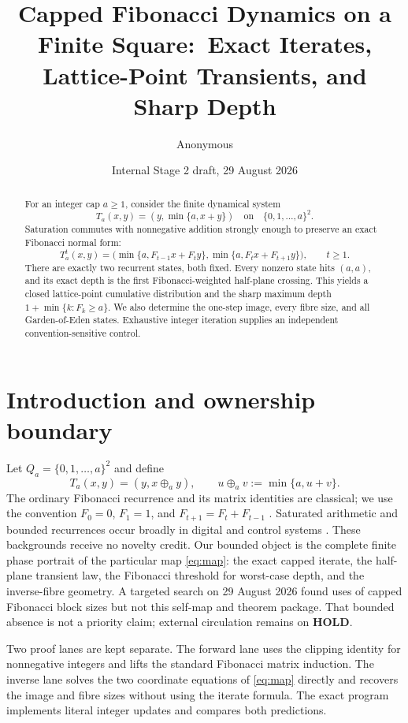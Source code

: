 \documentclass[11pt,a4paper]{amsart}
\title[Capped Fibonacci dynamics]{Capped Fibonacci Dynamics on a Finite Square:\ Exact Iterates, Lattice-Point Transients, and Sharp Depth}
\author{Anonymous}
\date{Internal Stage 2 draft, 29 August 2026}
\begin{document}
\begin{abstract}
For an integer cap $a\geq1$, consider the finite dynamical system
\[
 T_a(x,y)=(y,\min\{a,x+y\})
 \quad\text{on}\quad\{0,1,\ldots,a\}^2.
\]
Saturation commutes with nonnegative addition strongly enough to preserve an
exact Fibonacci normal form:
\[
 T_a^t(x,y)=
 \bigl(\min\{a,F_{t-1}x+F_ty\},
       \min\{a,F_tx+F_{t+1}y\}\bigr),\qquad t\geq1.
\]
There are exactly two recurrent states, both fixed.  Every nonzero state
hits $(a,a)$, and its exact depth is the first Fibonacci-weighted half-plane
crossing.  This yields a closed lattice-point cumulative distribution and
the sharp maximum depth $1+\min\{k:F_k\geq a\}$.  We also determine the
one-step image, every fibre size, and all Garden-of-Eden states.  Exhaustive
integer iteration supplies an independent convention-sensitive control.
\end{abstract}

\maketitle

\section{Introduction and ownership boundary}

Let $Q_a=\{0,1,\ldots,a\}^2$ and define
\begin{equation}
 \label{eq:map}
 T_a(x,y)=(y,x\oplus_a y),
 \qquad u\oplus_a v:=\min\{a,u+v\}.
\end{equation}
The ordinary Fibonacci recurrence and its matrix identities are classical;
we use the convention $F_0=0$, $F_1=1$, and
$F_{t+1}=F_t+F_{t-1}$ \citep{Koshy2001,Miles1960}.  Saturated arithmetic and
bounded recurrences occur broadly in digital and control systems
\citep{HmamedEtAl2010}.  These backgrounds receive no novelty credit.
Our bounded object is the complete finite phase portrait of the particular
map \eqref{eq:map}: the exact capped iterate, the half-plane transient law,
the Fibonacci threshold for worst-case depth, and the inverse-fibre
geometry.  A targeted search on 29 August 2026 found uses of capped
Fibonacci block sizes but not this self-map and theorem package.  That
bounded absence is not a priority claim; external circulation remains on
\textbf{HOLD}.

Two proof lanes are kept separate.  The forward lane uses the clipping
identity for nonnegative integers and lifts the standard Fibonacci matrix
induction.  The inverse lane solves the two coordinate equations of
\eqref{eq:map} directly and recovers the image and fibre sizes without using
the iterate formula.  The exact program implements literal integer updates
and compares both predictions.
\end{document}
